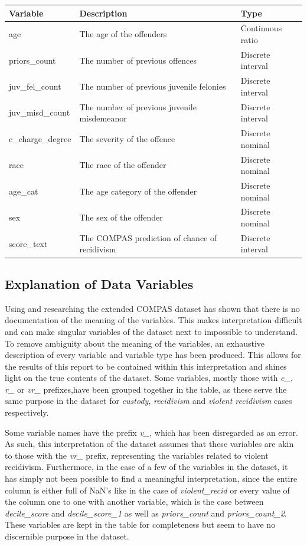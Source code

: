 \documentclass[11pt, fleqn, titlepage]{article}
\begin{document}
	
	\begin{table}[H]\label{resultater}
		\centering
		\begin{tabular}{l l l}
			Variable & Description & Type \\ \hline
			age & The age of the offenders & Continuous ratio \\
			priors\_count & The number of previous offences & Discrete interval \\
			juv\_fel\_count & The number of previous juvenile felonies & Discrete interval \\
			juv\_misd\_count & The number of previous juvenile misdemeanor & Discrete interval \\
			c\_charge\_degree & The severity of the offence & Discrete nominal \\
			race & The race of the offender & Discrete nominal \\
			age\_cat & The age category of the offender & Discrete nominal \\
			sex & The sex of the offender & Discrete nominal \\
			score\_text & The COMPAS prediction of chance of recidivism & Discrete interval
		\end{tabular}
	\end{table}
		
		
	\subsection{Explanation of Data Variables} \label{dataExamination}
	Using and researching the extended COMPAS dataset has shown that there is no documentation of the meaning of the variables. This makes interpretation difficult and can make singular variables of the dataset next to impossible to understand. To remove ambiguity about the meaning of the variables, an exhaustive description of every variable and variable type has been produced. This allows for the results of this report to be contained within this interpretation and shines light on the true contents of the dataset. Some variables, mostly those with \textit{c\_}, \textit{r\_} or \textit{vr\_} prefixes,have been grouped together in the table, as these serve the same purpose in the dataset for \textit{custody}, \textit{recidivism} and \textit{violent recidivism} cases respectively. 
	
	\noindent Some variable names have the prefix \textit{v\_}, which has been disregarded as an error. As such, this interpretation of the dataset assumes that these variables are akin to those with the \textit{vr\_} prefix, representing the variables related to violent recidivism. Furthermore, in the case of a few of the variables in the dataset, it has simply not been possible to find a meaningful interpretation, since the entire column is either full of NaN's like in the case of \textit{violent\_recid} or every value of the column one to one with another variable, which is the case between \textit{decile\_score} and \textit{decile\_score\_1} as well as \textit{priors\_count} and \textit{priors\_count\_2}. These variables are kept in the table for completeness but seem to have no discernible purpose in the dataset.
	
\end{document}
